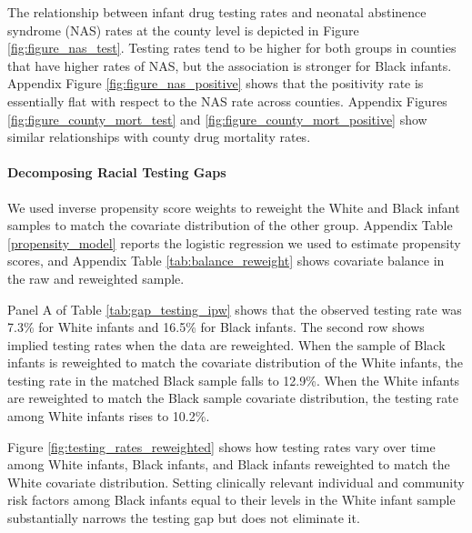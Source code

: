 The relationship between infant drug testing rates and neonatal abstinence syndrome (NAS) rates at the county level is depicted in Figure \ref{fig:figure_nas_test}. Testing rates tend to be higher for both groups in counties that have higher rates of NAS, but the association is stronger for Black infants. Appendix Figure \ref{fig:figure_nas_positive} shows that the positivity rate is essentially flat with respect to the NAS rate across counties. Appendix Figures \ref{fig:figure_county_mort_test}
and \ref{fig:figure_county_mort_positive} show similar relationships with county drug mortality rates.

\paragraph*{Decomposing Racial Testing Gaps}

We used inverse propensity score weights to reweight the White and Black infant samples to match the covariate distribution of the other group. Appendix Table \ref{propensity_model} reports the logistic regression we used to estimate propensity scores, and Appendix Table \ref{tab:balance_reweight} shows covariate balance in the raw and reweighted sample.

Panel A of Table \ref{tab:gap_testing_ipw} shows that the observed testing rate was 7.3\% for White infants and 16.5\% for Black infants. The second row shows implied testing rates when the data are reweighted. When the sample of Black infants is reweighted to match the covariate distribution of the White infants, the testing rate in the matched Black sample falls to 12.9\%. When the White infants are reweighted to match the Black sample covariate distribution, the testing rate among White infants rises to 10.2\%.  

Figure \ref{fig:testing_rates_reweighted} shows how testing rates vary over time among White infants, Black infants, and Black infants reweighted to match the White covariate distribution. Setting clinically relevant individual and community risk factors among Black infants equal to their levels in the White infant sample substantially narrows the testing gap but does not eliminate it. 

